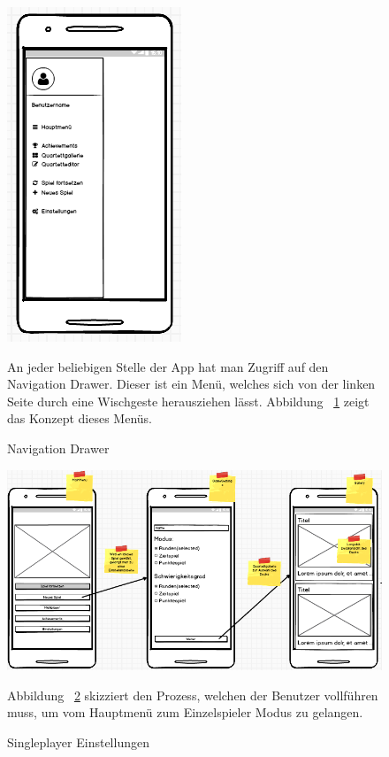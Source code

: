 \documentclass{scrartcl}
\begin{document}
\begin{figure}[!ht]
\begin{center}
	\includegraphics[scale=0.75]{img/mockup_drawer.png}
	\caption{Navigation Drawer}
	\label{drawer}
\end{center}
An jeder beliebigen Stelle der App hat man Zugriff auf den Navigation Drawer.
Dieser ist ein Menü, welches sich von der linken Seite durch eine Wischgeste
herausziehen lässt. Abbildung ~\ref{drawer} zeigt das Konzept dieses Menüs.
\end{figure}

\begin{figure}[!ht]
\begin{center}
	\includegraphics[scale=0.7]{img/mockup_game_process_1.png}
	\caption{Singleplayer Einstellungen}
	\label{singleplayer1}
\end{center}
Abbildung ~\ref{singleplayer1} skizziert den Prozess, welchen der Benutzer
vollführen muss, um vom Hauptmenü zum Einzelspieler Modus zu gelangen.
\end{figure}
\end{document}
